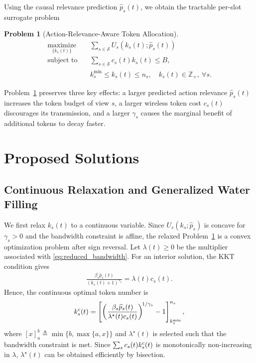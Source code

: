 \documentclass[lettersize,journal]{IEEEtran}
\theoremstyle{custom}
\newtheorem{Prob}{Problem}
\begin{document}
Using the causal relevance prediction $\widehat p_s(t)$, we obtain the tractable per-slot surrogate problem
\begin{Prob}[Action-Relevance-Aware Token Allocation]\label{prob:p2}
\begin{align}
    \underset{\{k_s(t)\}}{\textrm{maximize}}\quad
    & \sum_{s\in\mathcal S}U_s\!\left(k_s(t);\widehat p_s(t)\right) \label{eq:p2obj}\\
    \textrm{subject to}\quad
    & \sum_{s\in\mathcal S}c_s(t)k_s(t)\leq B, \nonumber\\
    & k_s^{\min}\leq k_s(t)\leq n_s,\quad k_s(t)\in\mathbb Z_+,\ \forall s. \nonumber
\end{align}
\end{Prob}
Problem~\ref{prob:p2} preserves three key effects: a larger predicted action relevance $\widehat p_s(t)$ increases the token budget of view $s$, a larger wireless token cost $c_s(t)$ discourages its transmission, and a larger $\gamma_s$ causes the marginal benefit of additional tokens to decay faster.

\section{Proposed Solutions}
\subsection{Continuous Relaxation and Generalized Water Filling}
We first relax $k_s(t)$ to a continuous variable. Since $U_s(k_s;\widehat p_s)$ is concave for $\gamma_s>0$ and the bandwidth constraint is affine, the relaxed Problem~\ref{prob:p2} is a convex optimization problem after sign reversal. Let $\lambda(t)\geq0$ be the multiplier associated with \eqref{eq:reduced_bandwidth}. For an interior solution, the KKT condition gives
\begin{align}
    \frac{\beta_s\widehat p_s(t)}{(k_s(t)+1)^{\gamma_s}}
    =\lambda(t)c_s(t).
\end{align}
Hence, the continuous optimal token number is
\begin{align}\label{eq:waterfill}
    k_s^{\rm c}(t)
    =\left[
    \left(
    \frac{\beta_s\widehat p_s(t)}{\lambda^\star(t)c_s(t)}
    \right)^{\!1/\gamma_s}-1
    \right]_{k_s^{\min}}^{n_s},
\end{align}
where $[x]_a^b\triangleq\min\{b,\max\{a,x\}\}$ and $\lambda^\star(t)$ is selected such that the bandwidth constraint is met. Since $\sum_s c_s(t)k_s^{\rm c}(t)$ is monotonically non-increasing in $\lambda$, $\lambda^\star(t)$ can be obtained efficiently by bisection.
\end{document}
